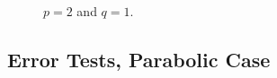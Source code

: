 \newpage

\vspace*{\fill}
\begin{figure}[!ht]
    \centering
    \begin{subfigure}[t]{0.49\textwidth}
        \centering
        
        \label{graph:2_1_hyp_l2l2}
    \end{subfigure}
    \par\bigskip
    \begin{subfigure}[t]{0.49\textwidth}
        \centering
        
        \label{graph:2_1_hyp_l2T}
    \end{subfigure}
    \hfill
    \begin{subfigure}[t]{0.49\textwidth}
        \centering
        
        \label{graph:2_1_hyp_linfl2}
    \end{subfigure}
    \caption{$p = 2$ and $q = 1$.}
\end{figure}
\vspace*{\fill}

\newpage
\subsection{Error Tests, Parabolic Case} \label{sec:tables_1}


